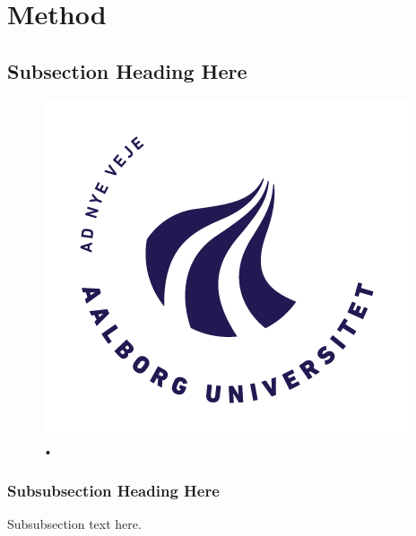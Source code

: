 \section{Method}
\label{Method}
%
\subsection{Subsection Heading Here}
\begin{figure}
\includegraphics[]{Figure/AAU_logo_2012.png}
\caption{•}
\label{•}
\end{figure}

\subsubsection{Subsubsection Heading Here}
Subsubsection text here.
